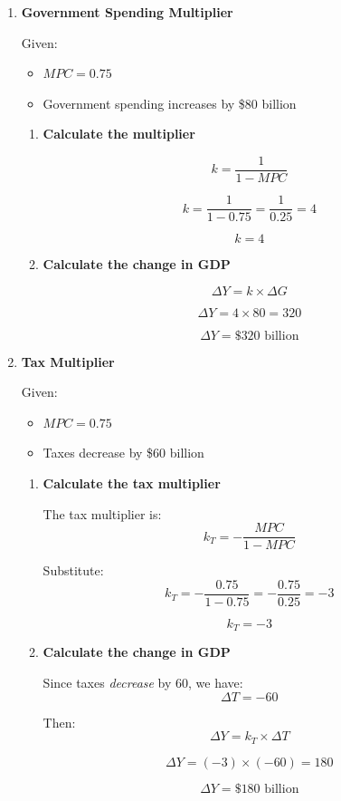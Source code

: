\documentclass[12pt]{article}
\begin{document}
\begin{enumerate}[label=\textbf{\arabic*.}, start=16]

\item \textbf{Government Spending Multiplier}

Given:
\begin{itemize}
    \item \(MPC = 0.75\)
    \item Government spending increases by \$80 billion
\end{itemize}

\begin{enumerate}
    \item[(a)] \textbf{Calculate the multiplier}

\[
k = \frac{1}{1-MPC}
\]

\[
k = \frac{1}{1-0.75} = \frac{1}{0.25} = 4
\]

\[
\boxed{k = 4}
\]

\item[(b)] \textbf{Calculate the change in GDP}

\[
\Delta Y = k \times \Delta G
\]

\[
\Delta Y = 4 \times 80 = 320
\]

\[
\boxed{\Delta Y = \$320 \text{ billion}}
\]
\end{enumerate}

\item \textbf{Tax Multiplier}

Given:
\begin{itemize}
    \item \(MPC = 0.75\)
    \item Taxes decrease by \$60 billion
\end{itemize}

\begin{enumerate}
    \item[(a)] \textbf{Calculate the tax multiplier}

The tax multiplier is:
\[
k_T = -\frac{MPC}{1-MPC}
\]

Substitute:
\[
k_T = -\frac{0.75}{1-0.75} = -\frac{0.75}{0.25} = -3
\]

\[
\boxed{k_T = -3}
\]

\item[(b)] \textbf{Calculate the change in GDP}

Since taxes \emph{decrease} by 60, we have:
\[
\Delta T = -60
\]

Then:
\[
\Delta Y = k_T \times \Delta T
\]

\[
\Delta Y = (-3)\times(-60)=180
\]

\[
\boxed{\Delta Y = \$180 \text{ billion}}
\]
\end{enumerate}

\end{enumerate}
\end{document}
